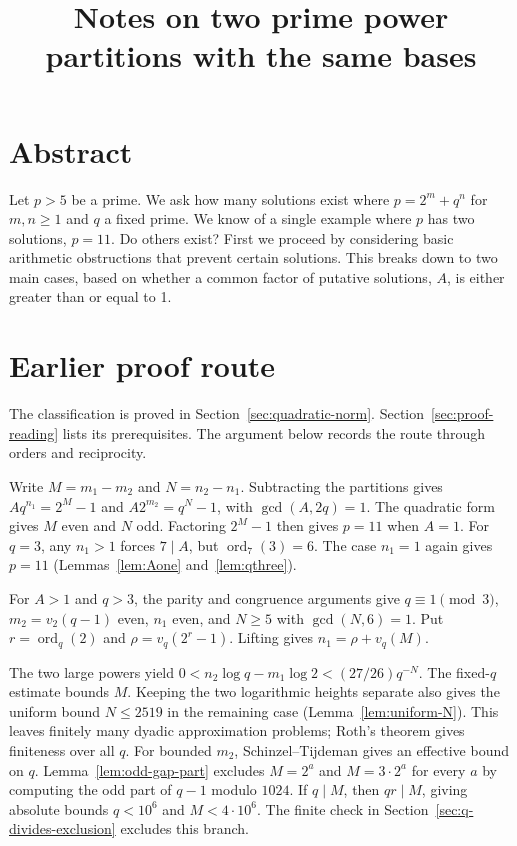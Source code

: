 \documentclass[11pt]{article}
\title{Notes on two prime power partitions with the same bases}
\author{}
\date{}
\begin{document}
\maketitle
\section*{Abstract}

Let $p > 5$ be a prime. We ask how many solutions exist where $p = 2^m + q^n$ for $m, n \geq 1$ and $q$ a fixed prime.
We know of a single example where $p$ has two solutions, $p =  11$. Do others exist? First we proceed by
considering basic arithmetic obstructions that prevent certain solutions. This breaks down to two main cases,
based on whether a common factor of putative solutions, $A$, is either greater than or equal to 1.

\section*{Earlier proof route}

The classification is proved in Section~\ref{sec:quadratic-norm}.
Section~\ref{sec:proof-reading} lists its prerequisites. The argument
below records the route through orders and reciprocity.

Write $M=m_1-m_2$ and $N=n_2-n_1$. Subtracting the partitions
gives $Aq^{n_1}=2^M-1$ and $A2^{m_2}=q^N-1$, with $\gcd(A,2q)=1$.
The quadratic form gives $M$ even and $N$ odd. Factoring $2^M-1$
then gives $p=11$ when $A=1$. For $q=3$, any $n_1>1$ forces $7\mid A$,
but $\operatorname{ord}_7(3)=6$. The case $n_1=1$ again gives $p=11$
(Lemmas~\ref{lem:Aone} and~\ref{lem:qthree}).

For $A>1$ and $q>3$, the parity and congruence arguments give
$q\equiv1\pmod3$, $m_2=v_2(q-1)$ even, $n_1$ even, and
$N\ge5$ with $\gcd(N,6)=1$. Put $r=\operatorname{ord}_q(2)$ and
$\rho=v_q(2^r-1)$. Lifting gives $n_1=\rho+v_q(M)$.

The two large powers yield
$0<n_2\log q-m_1\log 2<(27/26)q^{-N}$.
The fixed-$q$ estimate bounds $M$. Keeping the two logarithmic heights
separate also gives the uniform bound $N\le2519$ in the remaining
case (Lemma~\ref{lem:uniform-N}). This leaves finitely many
dyadic approximation problems; Roth's theorem gives finiteness
over all $q$. For bounded $m_2$, Schinzel--Tijdeman gives an
effective bound on $q$.
Lemma~\ref{lem:odd-gap-part} excludes $M=2^a$ and $M=3\cdot2^a$
for every $a$ by computing the odd part of $q-1$ modulo $1024$.
If $q\mid M$, then $qr\mid M$, giving absolute bounds $q<10^6$
and $M<4\cdot10^6$. The finite check in
Section~\ref{sec:q-divides-exclusion} excludes this branch.
\end{document}
